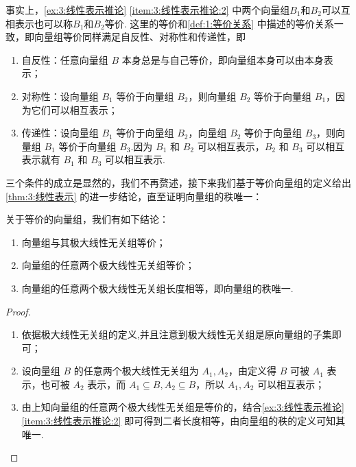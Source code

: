 事实上，\autoref{ex:3:线性表示推论} \ref*{item:3:线性表示推论:2} 中两个向量组$B_1$和$B_2$可以互相表示也可以称$B_1$和$B_2$等价. 这里的等价和\autoref{def:1:等价关系} 中描述的等价关系一致，即向量组等价同样满足自反性、对称性和传递性，即
\begin{enumerate}
    \item 自反性：任意向量组 $B$ 本身总是与自己等价，即向量组本身可以由本身表示；

    \item 对称性：设向量组 $B_1$ 等价于向量组 $B_2$，则向量组 $B_2$ 等价于向量组 $B_1$，因为它们可以相互表示；

    \item 传递性：设向量组 $B_1$ 等价于向量组 $B_2$，向量组 $B_2$ 等价于向量组 $B_3$，则向量组 $B_1$ 等价于向量组 $B_3$.因为 $B_1$ 和 $B_2$ 可以相互表示，$B_2$ 和 $B_3$ 可以相互表示就有 $B_1$ 和 $B_3$ 可以相互表示.
\end{enumerate}
三个条件的成立是显然的，我们不再赘述，接下来我们基于等价向量组的定义给出\autoref{thm:3:线性表示} 的进一步结论，直至证明向量组的秩唯一：
\begin{corollary}
    关于等价的向量组，我们有如下结论：
    \begin{enumerate}
        \item 向量组与其极大线性无关组等价；

        \item 向量组的任意两个极大线性无关组等价；

        \item 向量组的任意两个极大线性无关组长度相等，即向量组的秩唯一.
    \end{enumerate}
\end{corollary}

\begin{proof}
    \begin{enumerate}
        \item 依据极大线性无关组的定义,并且注意到极大线性无关组是原向量组的子集即可；

        \item 设向量组 $B$ 的任意两个极大线性无关组为 $A_1, A_2$，由定义得 $B$ 可被 $A_1$ 表示，也可被 $A_2$ 表示，而 $A_1 \subseteq B, A_2 \subseteq B$，所以 $A_1, A_2$ 可以相互表示；

        \item 由上知向量组的任意两个极大线性无关组是等价的，结合\autoref{ex:3:线性表示推论} \ref*{item:3:线性表示推论:2} 即可得到二者长度相等，由向量组的秩的定义可知其唯一.
    \end{enumerate}
\end{proof}

